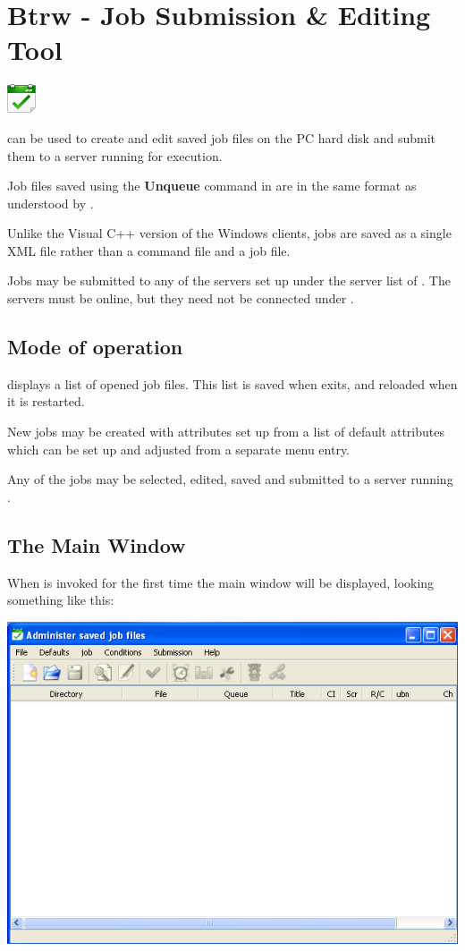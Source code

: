 \chapter{Btrw - Job Submission \& Editing Tool}
\label{chp:btrw}
\includegraphics{img/win3.png} 

 can be used to create and edit saved job files on the PC hard disk and submit
them to a server running \ProductName{} for execution.

Job files saved using the \textbf{Unqueue} command in  are in the same format
as understood by .

Unlike the Visual C++ version of the Windows clients, jobs are saved as a single XML file rather
than a command file and a job file.

Jobs may be submitted to any of the servers set up under the server list of . The servers
must be online, but they need not be connected under .

\section{Mode of operation}

 displays a list of opened job files. This list is saved when  exits, and reloaded when
it is restarted.

New jobs may be created with attributes set up from a list of default attributes which can be set up and adjusted from a
separate menu entry.

Any of the jobs may be selected, edited, saved and submitted to a server running \ProductName.

\section{The Main Window}
When  is invoked for the first time the main window will be displayed, looking something like this:

\includegraphics{img/btrwinitscr.png}

